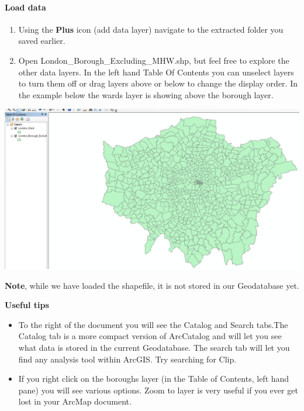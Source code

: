 \documentclass[]{book}
\providecommand{\tightlist}{%
  \setlength{\itemsep}{0pt}\setlength{\parskip}{0pt}}
\let\oldparagraph\paragraph
\renewcommand{\paragraph}[1]{\oldparagraph{#1}\mbox{}}
\begin{document}
\hypertarget{load-data}{%
\paragraph{Load data}\label{load-data}}

\begin{enumerate}
\def\labelenumi{\arabic{enumi}.}
\setcounter{enumi}{4}
\tightlist
\item
  Using the \textbf{Plus} icon (add data layer) navigate to the extracted folder you saved earlier.
\item
  Open London\_Borough\_Excluding\_MHW.shp, but feel free to explore the other data layers. In the left hand Table Of Contents you can unselect layers to turn them off or drag layers above or below to change the display order. In the example below the wards layer is showing above the borough layer.
\end{enumerate}

\begin{center}\includegraphics[width=800pt]{prac1_images/display_order} \end{center}

\textbf{Note}, while we have loaded the shapefile, it is not stored in our Geodatabase yet.

\textbf{Useful tips}

\begin{itemize}
\item
  To the right of the document you will see the Catalog and Search tabs.The Catalog tab is a more compact version of ArcCatalog and will let you see what data is stored in the current Geodatabase. The search tab will let you find any analysis tool within ArcGIS. Try searching for Clip.
\item
  If you right click on the boroughs layer (in the Table of Contents, left hand pane) you will see various options. Zoom to layer is very useful if you ever get lost in your ArcMap document.
\end{itemize}
\end{document}
